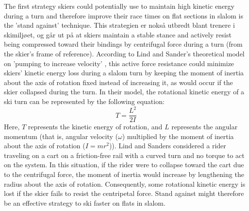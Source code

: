 The first strategy skiers could potentially use to maintain high kinetic energy during a turn and therefore improve their race times on flat sections in slalom is the 'stand against' technique. This strategien er nokså utbredt blant trenere i skimiljøet, og går ut på at skiers maintain a stable stance and actively resist being compressed toward their bindings by centrifugal force during a turn (from the skier's frame of reference). According to Lind and Sander's theoretical model on 'pumping to increase velocity' \cite{lind_physics_2004}, this active force resistance could minimize skiers' kinetic energy loss during a slalom turn by keeping the moment of inertia about the axis of rotation fixed instead of increasing it, as would occur if the skier collapsed during the turn. In their model, the rotational kinetic energy of a ski turn can be represented by the following equation: 
\[ T = \frac{L^2}{2I} \]
Here, $T$ represents the kinetic energy of rotation, and $L$ represents the angular momentum (that is, angular velocity ($\omega$) multiplied by the moment of inertia about the axis of rotation ($I = mr^2$)). Lind and Sanders considered a rider traveling on a cart on a friction-free rail with a curved turn and no torque to act on the system. In this situation, if the rider were to collapse toward the cart due to the centrifugal force, the moment of inertia would increase by lengthening the radius about the axis of rotation. Consequently, some rotational kinetic energy is lost if the skier fails to resist the centripetal force. Stand against might therefore be an effective strategy to ski faster on flats in slalom.  

